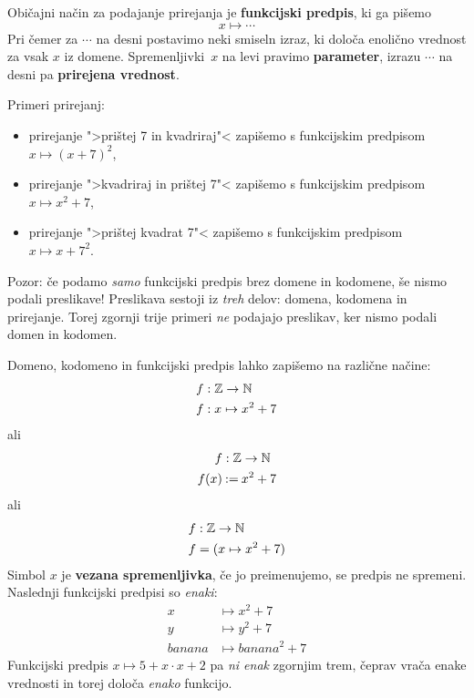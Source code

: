 Običajni način za podajanje prirejanja je \textbf{funkcijski predpis}, ki ga pišemo
%
\begin{equation*}
  x \mapsto \cdots
\end{equation*}
%
Pri čemer za $\cdots$ na desni postavimo neki smiseln izraz, ki določa enolično vrednost za vsak $x$ iz domene. Spremenljivki~$x$ na levi pravimo \textbf{parameter}, izrazu $\cdots$ na desni pa \textbf{prirejena vrednost}.

\begin{primer}
  Primeri prirejanj:
  \begin{itemize}
  \item prirejanje ">prištej 7 in kvadriraj"< zapišemo s funkcijskim predpisom  $x \mapsto (x + 7)^2$,
  \item prirejanje ">kvadriraj in prištej 7"< zapišemo s funkcijskim predpisom  $x \mapsto x^2 + 7$,
  \item prirejanje ">prištej kvadrat 7"< zapišemo s funkcijskim predpisom  $x \mapsto x + 7^2$.
  \end{itemize}
\end{primer}

\begin{opomba}
  Pozor: če podamo \emph{samo} funkcijski predpis brez domene in kodomene, še nismo podali preslikave! Preslikava sestoji iz \emph{treh} delov: domena, kodomena in prirejanje.
  Torej zgornji trije primeri \emph{ne} podajajo preslikav, ker nismo podali domen in
  kodomen.
\end{opomba}

Domeno, kodomeno in funkcijski predpis lahko zapišemo na različne načine:
%
\begin{align*}
  f &: \mathbb{Z} \to \mathbb{N} \\
  f &: x \mapsto x^2 + 7
\end{align*}
%
ali
%
\begin{align*}
    f &: \mathbb{Z} \to \mathbb{N} \\
    f(x) &\mathbin{{:}{=}} x^2 + 7
\end{align*}
%
ali
%
\begin{align*}
    f &: \mathbb{Z} \to \mathbb{N} \\
    f &= (x \mapsto x^2 + 7)
\end{align*}
%
Simbol $x$ je \textbf{vezana spremenljivka}, če jo preimenujemo, se predpis ne spremeni. Naslednji funkcijski predpisi so \emph{enaki}:
%
\begin{align*}
  x &\mapsto x^2 + 7 \\
  y &\mapsto y^2 + 7 \\
  \textit{banana} &\mapsto \textit{banana}^2 + 7
\end{align*}
%
Funkcijski predpis $x \mapsto 5 + x \cdot x + 2$ pa \emph{ni enak} zgornjim trem, čeprav vrača enake vrednosti in torej določa \emph{enako} funkcijo.

